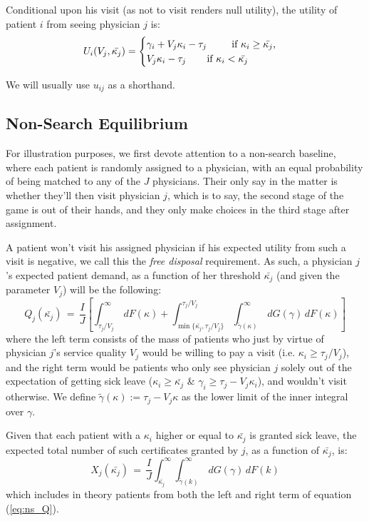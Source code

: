 \documentclass[../main.tex]{subfiles}
\begin{document}
Conditional upon his visit (as not to visit renders null utility), the utility of patient $i$ from seeing physician $j$ is:
\[
    U_i(V_j,\bar{\kappa_j}) =\begin{cases}
    \gamma_i + V_j \kappa_i - \tau_j \text{  \hspace{0.65cm} if $\kappa_i \geq \bar{\kappa_j}$,} \\
    V_j \kappa_i - \tau_j \text{  \hspace{0.5cm} if $\kappa_i < \bar{\kappa_j}$}
    \end{cases}
\]

We will usually use $u_{ij}$ as a shorthand.

\subsection{Non-Search Equilibrium}

For illustration purposes, we first devote attention to a non-search baseline, where each patient is randomly assigned to a physician, with an equal probability of being matched to any of the $J$ physicians. Their only say in the matter is whether they'll then visit physician $j$, which is to say, the second stage of the game is out of their hands, and they only make choices in the third stage after assignment.

A patient won't visit his assigned physician if his expected utility from such a visit is negative, we call this the \textit{free disposal} requirement. As such, a physician $j$'s expected patient demand, as a function of her threshold $\bar{\kappa_j}$ (and given the parameter $V_j$) will be the following:
\begin{equation}
    Q_j(\bar{\kappa_j}) \,=\, \frac{I}{J}\left[ \int_{\tau_j/V_j}^{\infty}\,dF(\kappa) +  \int_{\min\{\bar{\kappa_j},\tau_j/V_j\}}^{\tau_j/V_j} \int_{\tilde{\gamma}(\kappa)}^{\infty} \,dG(\gamma) \,dF(\kappa) \right] \label{eq:ns_Q}
\end{equation}
where the left term consists of the mass of patients who just by virtue of physician $j$'s service quality $V_j$ would be willing to pay a visit (i.e. $\kappa_i \geq \tau_j/V_j$), and the right term would be patients who only see physician $j$ solely out of the expectation of getting sick leave ($\kappa_i \geq \bar{\kappa_j}$ \& $\gamma_i \geq \tau_j - V_j \kappa_i$), and wouldn't visit otherwise. We define $\tilde{\gamma}(\kappa) := \tau_j - V_j \kappa$ as the lower limit of the inner integral over $\gamma$.

Given that each patient with a $\kappa_i$ higher or equal to $\bar{\kappa_j}$ is granted sick leave, the expected total number of such certificates granted by $j$, as a function of $\bar{\kappa_j}$, is:
\begin{equation}
    X_j(\bar{\kappa_j}) \,=\, \frac{I}{J} \int_{\bar{\kappa_j}}^{\infty} \int_{\tilde{\gamma}(k)}^{\infty} \,dG(\gamma) \,dF(k)
   \label{eq:ns_X}
\end{equation}
which includes in theory patients from both the left and right term of equation (\ref{eq:ns_Q}).
\end{document}
